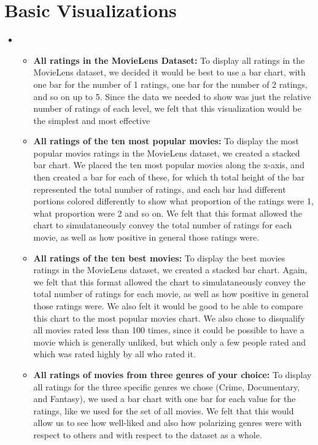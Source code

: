 \section{Basic Visualizations}
\medskip
\begin{itemize}

    \item {}
    \begin{itemize}
    \item \textbf{All ratings in the MovieLens Dataset:} To display all ratings in the MovieLens dataset, we decided it would be best to use a bar chart, with one bar for the number of 1 ratings, one bar for the number of 2 ratings, and so on up to 5. Since the data we needed to show was just the relative number of ratings of each level, we felt that this visualization would be the simplest and most effective

    \item \textbf{All ratings of the ten most popular movies:} To display the most popular movies ratings in the MovieLens dataset, we created a stacked bar chart. We placed the ten most popular movies along the x-axis, and then created a bar for each of these, for which th total height of the bar represented the total number of ratings, and each bar had different portions colored differently to show what proportion of the ratings were 1, what proportion were 2 and so on. We felt that this format allowed the chart to simulataneously convey the total number of ratings for each movie, as well as how positive in general those ratings were.

    \item \textbf{All ratings of the ten best movies:} To display the best movies ratings in the MovieLens dataset, we created a stacked bar chart. Again, we felt that this format allowed the chart to simulataneously convey the total number of ratings for each movie, as well as how positive in general those ratings were. We also felt it would be good to be able to compare this chart to the most popular movies chart. We also chose to disqualify all movies rated less than 100 times, since it could be possible to have a movie which is generally unliked, but which only a few people rated and which was rated highly by all who rated it.

    \item \textbf{All ratings of movies from three genres of your choice:} To display all ratings for the three specific genres we chose (Crime, Documentary, and Fantasy), we used a bar chart with one bar for each value for the ratings, like we used for the set of all movies. We felt that this would allow us to see how well-liked and also how polarizing genres were with respect to others and with respect to the dataset as a whole.


\end{itemize}
\end{itemize}
